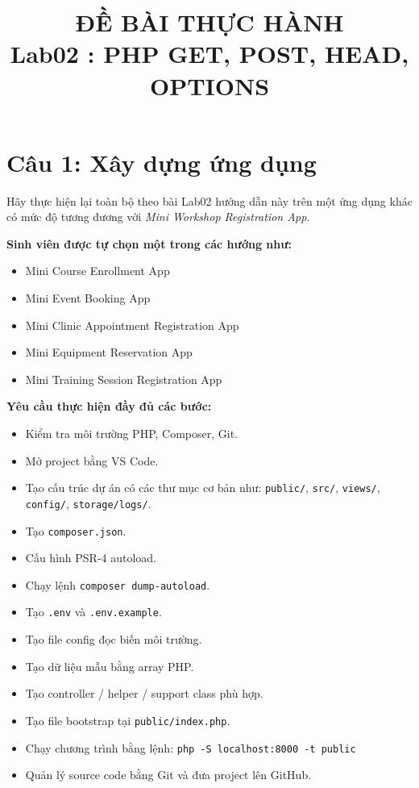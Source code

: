 \documentclass[12pt,a4paper]{article}
\title{\textbf{ĐỀ BÀI THỰC HÀNH}\\ \Large{Lab02 : PHP GET, POST, HEAD, OPTIONS}}
\author{}
\date{}
\begin{document}
\maketitle

\section*{Câu 1: Xây dựng ứng dụng}

Hãy thực hiện lại toàn bộ theo bài Lab02 hướng dẫn này trên một ứng dụng khác có mức độ tương đương với \textit{Mini Workshop Registration App}.

\textbf{Sinh viên được tự chọn một trong các hướng như:}
\begin{itemize}[noitemsep]
    \item Mini Course Enrollment App
    \item Mini Event Booking App
    \item Mini Clinic Appointment Registration App
    \item Mini Equipment Reservation App
    \item Mini Training Session Registration App
\end{itemize}

\textbf{Yêu cầu thực hiện đầy đủ các bước:}
\begin{itemize}[noitemsep]
    \item Kiểm tra môi trường PHP, Composer, Git.
    \item Mở project bằng VS Code.
    \item Tạo cấu trúc dự án có các thư mục cơ bản như: \texttt{public/}, \texttt{src/}, \texttt{views/}, \texttt{config/}, \texttt{storage/logs/}.
    \item Tạo \texttt{composer.json}.
    \item Cấu hình PSR-4 autoload.
    \item Chạy lệnh \texttt{composer dump-autoload}.
    \item Tạo \texttt{.env} và \texttt{.env.example}.
    \item Tạo file config đọc biến môi trường.
    \item Tạo dữ liệu mẫu bằng array PHP.
    \item Tạo controller / helper / support class phù hợp.
    \item Tạo file bootstrap tại \texttt{public/index.php}.
    \item Chạy chương trình bằng lệnh: \texttt{php -S localhost:8000 -t public}
    \item Quản lý source code bằng Git và đưa project lên GitHub.
\end{itemize}
\end{document}
